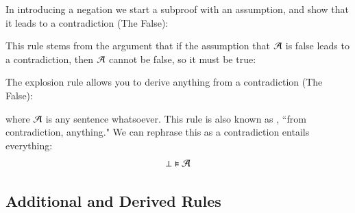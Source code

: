 \documentclass[12pt, a4paper, oneside, openright, titlepage]{book}
\begin{document}
\begin{defn}
    In introducing a negation we start a subproof with an assumption, and show that it leads to a contradiction (The False): \begin{fitchproof}
        \open
        \close
         
    \end{fitchproof}
\end{defn}


\begin{defn}
    This rule stems from the argument that if the assumption that $\mathcal{A}$ is false leads to a contradiction, then $\mathcal{A}$ cannot be false, so it must be true: \begin{fitchproof}
        \open
        \close
         
    \end{fitchproof}
\end{defn}


\begin{defn}
    The explosion rule allows you to derive anything from a contradiction (The False): \begin{fitchproof}
         
    \end{fitchproof}
    where $\mathcal{A}$ is any sentence whatsoever. This rule is also known as , ``from contradiction, anything." We can rephrase this as a contradiction entails everything: \begin{equation*}
        \bot \vDash \mathcal{A}
    \end{equation*}
\end{defn}



\subsection{\textsection Additional and Derived Rules}
\end{document}

